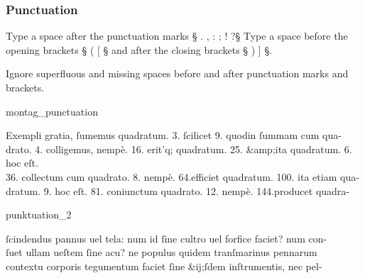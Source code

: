 \subsubsection{Punctuation}
\label{section latin punctuation}

\begin{mainrule}
Type a space after the punctuation marks § . , : ; ! ?§ \quad
Type a space before the opening brackets § ( [ § and after the closing brackets  § ) ] §.
\end{mainrule}

\begin{clarification}
Ignore superfluous and missing spaces before and after punctuation marks and brackets.
\end{clarification}

\vspace{2mm}
\begin{sampleImage}{montag_punctuation}
\begin{typeLatin}
Exempli gratia, ſumemus quadratum. 3. ſcilicet 9. quod\lwr in ſummam cum qua- \\
drato. 4. colligemus, nempè. 16. erit\bs'q; quadratum. 25. &amp;\lwr ita quadratum. 6. hoc eſt. \\
36. collectum cum quadrato. 8. nempè. 64.\lwr efficiet quadratum. 100. ita etiam qua- \\
dratum. 9. hoc eſt. 81. coniunctum quadrato. 12. nempè. 144.\lwr producet quadra-  \\
\someText {}
\end{typeLatin}
\end{sampleImage}

\begin{sampleImage}{punktuation_2}
\begin{typeLatin}
 \someText
{}ſcindendus pannus uel tela: num id ſine cultro uel forfice faciet? num con- \\
ſuet ullam ueſtem ſine acu? ne populus quidem tranſmarinus pennarum \\
contextu corporis tegumentum faciet ſine &ij;ſdem inſtrumentis, nec pel- \\
\someText {}
\end{typeLatin}
\end{sampleImage}


